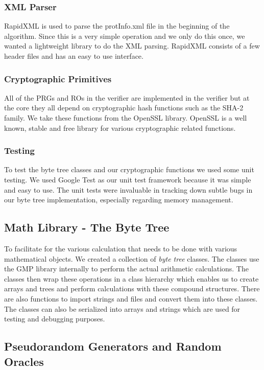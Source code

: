 \subsubsection{XML Parser}

RapidXML is used to parse the protInfo.xml file in the beginning of
the algorithm. Since this is a very simple operation and we only do
this once, we wanted a lightweight library to do the XML
parsing. RapidXML consists of a few header files and has an easy to
use interface.

\subsubsection{Cryptographic Primitives}

All of the PRGs and ROs in the verifier are implemented in the
verifier but at the core they all depend on cryptographic hash
functions such as the SHA-2 family. We take these functions from the
OpenSSL library. OpenSSL is a well known, stable and free library for
various cryptographic related functions.

\subsubsection{Testing}

To test the byte tree classes and our cryptographic functions we used
some unit testing. We used Google Test as our unit test framework
because it was simple and easy to use. The unit tests were invaluable
in tracking down subtle bugs in our byte tree implementation,
especially regarding memory management.

\subsection{Math Library - The Byte Tree}

To facilitate for the various calculation that needs to be done with
various mathematical objects. We created a collection of \emph{byte
  tree} classes. The classes use the GMP library internally to perform
the actual arithmetic calculations. The classes then wrap these
operations in a class hierarchy which enables us to create arrays and
trees and perform calculations with these compound structures. There
are also functions to import strings and files and convert them into
these classes. The classes can also be serialized into arrays and
strings which are used for testing and debugging purposes.

\subsection{Pseudorandom Generators and Random Oracles}


